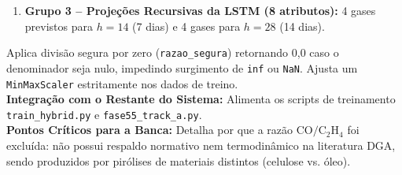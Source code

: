 \documentclass[10pt,a4paper]{article}
\begin{document}
\begin{filebox}
\begin{enumerate}[leftmargin=*,itemsep=1pt]
\begin{itemize}[leftmargin=*,itemsep=0pt]
      \item $\text{C}_2\text{H}_2 / \text{TH}_{\text{katser}}$ e $\text{C}_2\text{H}_4 / \text{TH}_{\text{katser}}$: Proporções relativas normalizadas.
    \end{itemize}
  \item \textbf{Grupo 3 -- Projeções Recursivas da LSTM (8 atributos):} 4 gases previstos para $h=14$ (7 dias) e 4 gases para $h=28$ (14 dias).
\end{enumerate}
Aplica divisão segura por zero (\texttt{razao\_segura}) retornando 0,0 caso o denominador seja nulo, impedindo surgimento de \texttt{inf} ou \texttt{NaN}. Ajusta um \texttt{MinMaxScaler} estritamente nos dados de treino.\\
\textbf{Integração com o Restante do Sistema:} Alimenta os scripts de treinamento \texttt{train\_hybrid.py} e \texttt{fase55\_track\_a.py}.\\
\textbf{Pontos Críticos para a Banca:} Detalha por que a razão $\text{CO}/\text{C}_2\text{H}_4$ foi excluída: não possui respaldo normativo nem termodinâmico na literatura DGA, sendo produzidos por pirólises de materiais distintos (celulose vs. óleo).
\end{filebox}
\end{document}

